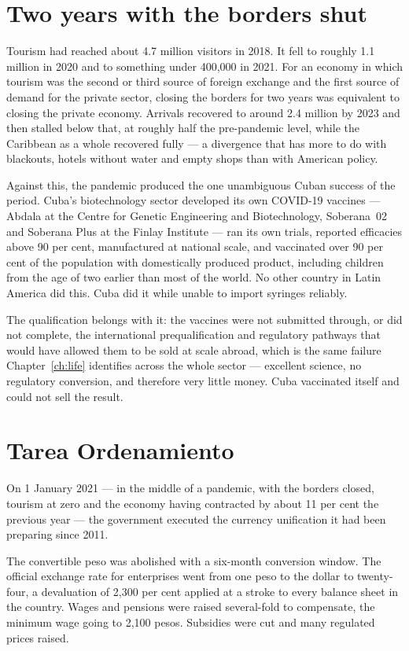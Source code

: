 \section{Two years with the borders shut}

Tourism had reached about 4.7 million visitors in 2018. It fell to roughly 1.1
million in 2020 and to something under 400,000 in 2021.\unv{} For an economy in
which tourism was the second or third source of foreign exchange and the first
source of demand for the private sector, closing the borders for two years was
equivalent to closing the private economy. Arrivals recovered to around 2.4
million by 2023 and then stalled below that, at roughly half the pre-pandemic
level, while the Caribbean as a whole recovered fully --- a divergence that has
more to do with blackouts, hotels without water and empty shops than with
American policy.\unv{}

Against this, the pandemic produced the one unambiguous Cuban success of the
period. Cuba's biotechnology sector developed its own COVID-19 vaccines ---
Abdala at the Centre for Genetic Engineering and Biotechnology, Soberana~02 and
Soberana Plus at the Finlay Institute --- ran its own trials, reported
efficacies above 90 per cent, manufactured at national scale, and vaccinated
over 90 per cent of the population with domestically produced product,
including children from the age of two earlier than most of the
world.\unv{} No other country in Latin America did this. Cuba
did it while unable to import syringes reliably.

The qualification belongs with it: the vaccines were not submitted through, or
did not complete, the international prequalification and regulatory pathways
that would have allowed them to be sold at scale abroad, which is the same
failure Chapter~\ref{ch:life} identifies across the whole sector --- excellent
science, no regulatory conversion, and therefore very little money. Cuba
vaccinated itself and could not sell the result.

\section{Tarea Ordenamiento}

On 1 January 2021 --- in the middle of a pandemic, with the borders closed,
tourism at zero and the economy having contracted by about 11 per cent the
previous year --- the government executed the currency unification it had been
preparing since 2011.

The convertible peso was abolished with a six-month conversion window. The
official exchange rate for enterprises went from one peso to the dollar to
twenty-four, a devaluation of 2,300 per cent applied at a stroke to every
balance sheet in the country. Wages and pensions were raised several-fold to
compensate, the minimum wage going to 2,100 pesos. Subsidies were cut and many
regulated prices raised.

